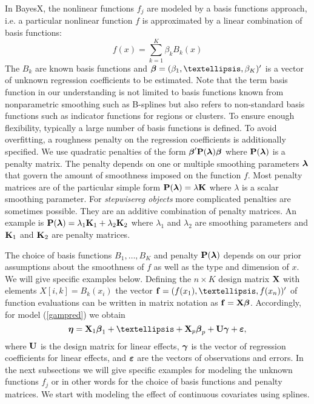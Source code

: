 \documentclass[11pt,a4paper,twoside]{bayesxarticle}
\begin{document}
In BayesX, the nonlinear functions $f_j$ are modeled by a basis
functions approach, i.e. a particular nonlinear function $f$ is
approximated by a linear combination of basis functions:
$$
f(x) = \sum_{k=1}^{K} \beta_k B_k(x)
$$
The $B_k$ are known basis functions and $\betavec =
(\beta_1,\dots,\beta_K)'$ is a vector of unknown regression
coefficients to be estimated. Note that the term basis function in
our understanding is not limited to basis functions known from
nonparametric smoothing such as B-splines but also refers to
non-standard basis functions such as indicator functions for regions
or clusters. To ensure enough flexibility, typically a large number
of basis functions is defined. To avoid overfitting, a roughness
penalty on the regression coefficients is additionally specified. We
use quadratic penalties of the form $\boldsymbol{\beta}' \mathbf{P}(\boldsymbol{\lambda})
\boldsymbol{\beta}$ where $\mathbf{P}(\boldsymbol{\lambda})$ is a penalty matrix. The penalty
depends on one or multiple smoothing parameters $\boldsymbol{\lambda}$ that
govern the amount of smoothness imposed on the function $f$. Most
penalty matrices are of the particular simple form
$\mathbf{P}(\boldsymbol{\lambda}) = \lambda \mathbf{K}$ where $\lambda$ is a scalar
smoothing parameter. For {\em stepwisereg objects} more complicated
penalties are sometimes possible. They are an additive combination
of penalty matrices. An example is $\mathbf{P}(\boldsymbol{\lambda}) = \lambda_1
\mathbf{K}_1+\lambda_2 \mathbf{K}_2$ where $\lambda_1$ and $\lambda_2$ are
smoothing parameters and $\mathbf{K}_1$ and $\mathbf{K}_2$ are penalty
matrices.

The choice of basis functions $B_1,\dots,B_K$ and penalty  $\mathbf{P}(\boldsymbol{\lambda})$ depends on our prior assumptions about the smoothness
of $f$ as well as
the type and dimension of $x$. We will give specific examples below. Defining the $n \times K$ design matrix $\mathbf{X}$ with elements
$X[i,k] = B_k(x_i)$ the
vector $\fvec = (f(x_1),\dots,f(x_n))'$ of function evaluations can be written in matrix notation as $\mathbf{f} = \mathbf{X} \boldsymbol{\beta}$.
Accordingly,  for model (\ref{gampred}) we obtain
$$
\etavec = \Xvec_1 \betavec_1 + \ldots + \Xvec_p \betavec_p + \Uvec \gammavec +  \varepsilonvec,
$$
where $\mathbf{U}$ is the design matrix for linear effects, $\boldsymbol{\gamma}$ is the vector of regression coefficients for linear effects, and
$\boldsymbol{\varepsilon}$
are the vectors of observations and errors.
In the next subsections we will give specific examples for modeling the unknown functions $f_j$ or in other words for the choice of basis functions and
penalty matrices.
We start with modeling the effect of continuous covariates using splines.
\end{document}
